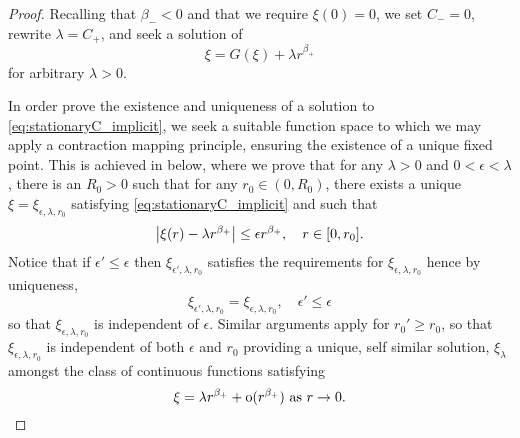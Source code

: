 \documentclass{amsart}
\begin{document}
\begin{proof}
Recalling that \(\beta_- < 0\) and that we require \(\xi(0) = 0\), we set \(C_- = 0\), rewrite \(\lambda = C_+\), and seek a solution of
\begin{equation}
\label{eq:stationaryC_implicit}
\xi = G(\xi) + \lambda r^{\beta_+}
\end{equation}
for arbitrary \(\lambda > 0\).

In order prove the existence and uniqueness of a solution to \eqref{eq:stationaryC_implicit}, we seek a suitable function space to which we may apply a contraction mapping principle, ensuring the existence of a unique fixed point. This is achieved in  below, where we prove that for any \(\lambda > 0\) and \(0 < \epsilon < \lambda\), there is an \(R_0 > 0\) such that for any \(r_0 \in (0, R_0)\), there exists a unique \(\xi = \xi_{\epsilon, \lambda, r_0}\) satisfying \eqref{eq:stationaryC_implicit} and such that
\[
\left|{\xi(r) - \lambda r^{\beta_+}}\right| \leq \epsilon r^{\beta_+}, \quad r \in [0, r_0].
\]
Notice that if \(\epsilon' \leq \epsilon\) then \(\xi_{\epsilon', \lambda, r_0}\) satisfies the requirements for \(\xi_{\epsilon, \lambda, r_0}\) hence by uniqueness,
\[
\xi_{\epsilon', \lambda, r_0} = \xi_{\epsilon, \lambda, r_0}, \quad \epsilon' \leq \epsilon
\]
so that \(\xi_{\epsilon, \lambda, r_0}\) is independent of \(\epsilon\). Similar arguments apply for \(r_0' \geq r_0\), so that \(\xi_{\epsilon, \lambda, r_0}\) is independent of both \(\epsilon\) and \(r_0\) providing a unique, self similar solution, \(\xi_{\lambda}\) amongst the class of continuous functions satisfying
\[
\xi = \lambda r^{\beta_+} + \operatorname{o}(r^{\beta_+}) \text{ as } r \to 0.
\]
\end{proof}
\end{document}
